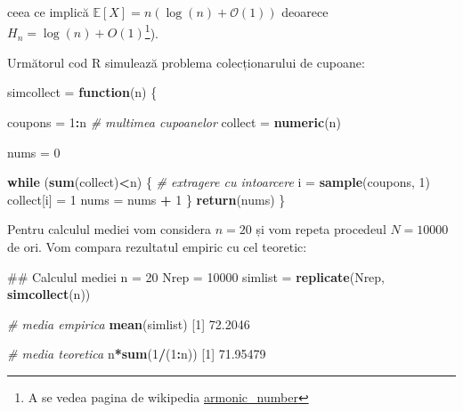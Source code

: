 \documentclass[]{article}
\newenvironment{Shaded}{\begin{snugshade}}{\end{snugshade}}
\newcommand{\KeywordTok}[1]{\textcolor[rgb]{0.13,0.29,0.53}{\textbf{#1}}}
\newcommand{\DecValTok}[1]{\textcolor[rgb]{0.00,0.00,0.81}{#1}}
\newcommand{\FloatTok}[1]{\textcolor[rgb]{0.00,0.00,0.81}{#1}}
\newcommand{\StringTok}[1]{\textcolor[rgb]{0.31,0.60,0.02}{#1}}
\newcommand{\CommentTok}[1]{\textcolor[rgb]{0.56,0.35,0.01}{\textit{#1}}}
\newcommand{\ControlFlowTok}[1]{\textcolor[rgb]{0.13,0.29,0.53}{\textbf{#1}}}
\newcommand{\OperatorTok}[1]{\textcolor[rgb]{0.81,0.36,0.00}{\textbf{#1}}}
\newcommand{\NormalTok}[1]{#1}
\let\rmarkdownfootnote\footnote%
\def\footnote{\protect\rmarkdownfootnote}
\begin{document}
ceea ce implică
\(\mathbb{E}[X] = n\left(\log(n) + \mathcal{O}(1)\right)\) deoarece
\(H_n = \log(n)+O(1)\)\footnote{A se vedea pagina de wikipedia
  \href{https://en.wikipedia.org/wiki/Harmonic_number}{armonic\_number}}).

Următorul cod R simulează problema colecționarului de cupoane:

\begin{Shaded}
\begin{Highlighting}[]
\NormalTok{simcollect =}\StringTok{ }\ControlFlowTok{function}\NormalTok{(n) \{}
  
\NormalTok{coupons =}\StringTok{ }\DecValTok{1}\OperatorTok{:}\NormalTok{n }\CommentTok{# multimea cupoanelor}
\NormalTok{collect =}\StringTok{ }\KeywordTok{numeric}\NormalTok{(n)}

\NormalTok{nums =}\StringTok{ }\DecValTok{0}

\ControlFlowTok{while}\NormalTok{ (}\KeywordTok{sum}\NormalTok{(collect)}\OperatorTok{<}\NormalTok{n)}
\NormalTok{\{}
  \CommentTok{# extragere cu intoarcere}
\NormalTok{    i =}\StringTok{ }\KeywordTok{sample}\NormalTok{(coupons, }\DecValTok{1}\NormalTok{)}
\NormalTok{    collect[i] =}\StringTok{ }\DecValTok{1}
\NormalTok{    nums =}\StringTok{ }\NormalTok{nums }\OperatorTok{+}\StringTok{ }\DecValTok{1}
\NormalTok{\}}
\KeywordTok{return}\NormalTok{(nums)}
\NormalTok{\}}
\end{Highlighting}
\end{Shaded}

Pentru calculul mediei vom considera \(n = 20\) și vom repeta procedeul
\(N = 10000\) de ori. Vom compara rezultatul empiric cu cel teoretic:

\begin{Shaded}
\begin{Highlighting}[]
\NormalTok{## Calculul mediei}
\NormalTok{n =}\StringTok{ }\DecValTok{20}
\NormalTok{Nrep =}\StringTok{ }\DecValTok{10000}
\NormalTok{simlist =}\StringTok{ }\KeywordTok{replicate}\NormalTok{(Nrep, }\KeywordTok{simcollect}\NormalTok{(n))}

\CommentTok{# media empirica}
\KeywordTok{mean}\NormalTok{(simlist)}
\NormalTok{[}\DecValTok{1}\NormalTok{] }\FloatTok{72.2046}

\CommentTok{# media teoretica}
\NormalTok{n}\OperatorTok{*}\KeywordTok{sum}\NormalTok{(}\DecValTok{1}\OperatorTok{/}\NormalTok{(}\DecValTok{1}\OperatorTok{:}\NormalTok{n))}
\NormalTok{[}\DecValTok{1}\NormalTok{] }\FloatTok{71.95479}
\end{Highlighting}
\end{Shaded}
\end{document}
